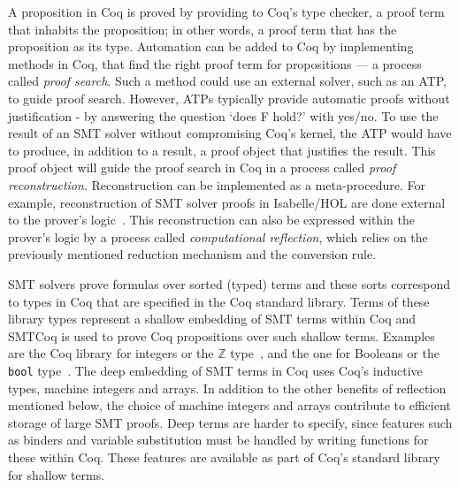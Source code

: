 \documentclass{article}
\begin{document}
	A proposition in Coq is proved by 
	providing to Coq's type checker, a 
	proof term that inhabits the 
	proposition; in other words, a 
	proof term that has the proposition 
	as its type. Automation can be 
	added to Coq by implementing 
	methods in Coq, that find the right 
	proof term for propositions --- a 
	process called \textit{proof search}. 
	Such a method could use an external 
	solver, such as an ATP, to guide 
	proof search. However, ATPs 
	typically provide automatic 
	proofs without justification - 
	by answering the question `does F 
	hold?' with	yes/no. To use the 
	result of an SMT solver without 
	compromising Coq's kernel, the ATP 
	would have to produce, in addition 
	to a result, a proof object
	that justifies the result. This 
	proof object will guide the proof search 
	in Coq in a process called 
	\textit{proof reconstruction}. 
	Reconstruction can be implemented 
	as a meta-procedure. For example, 
	reconstruction of SMT solver proofs 
	in Isabelle/HOL are done external to 
	the prover's logic~\cite{bohme}. 
	This reconstruction can also be 
	expressed within the prover's logic 
	by a process called 
	\textit{computational reflection}, 
	which relies on the previously 
	mentioned reduction mechanism and 
	the conversion rule.
	
	

	SMT solvers prove formulas over 
	sorted (typed) terms and these 
	sorts correspond to types in 
	Coq that are specified in the 
	Coq standard library. Terms of 
	these library types represent a 
	shallow embedding of SMT 
	terms within Coq and SMTCoq is used 
	to prove Coq propositions over such 
	shallow terms. Examples are the 
	Coq library for integers or 
	the $\mathbb{Z}$ type~\cite{CoqZ},
	and the one for Booleans or the 
	\texttt{bool} type~\cite{CoqBool}.
	The deep embedding of SMT terms 
	in Coq uses Coq's inductive types,
	machine integers and arrays. In 
	addition to the other benefits 
	of reflection mentioned below,
	the choice of machine integers 
	and arrays contribute to 
	efficient storage of large 
	SMT proofs. Deep terms are harder 
	to specify, since features such as 
	binders 
	and variable substitution must be 
	handled by writing functions 
	for these within Coq. These 
	features are available as part 
	of Coq's standard library 
	for shallow terms. 
	
\end{document}
